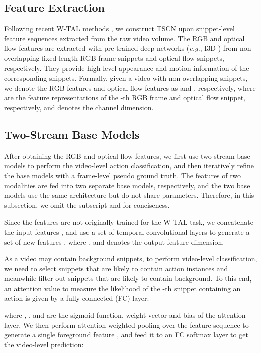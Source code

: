 \documentclass[runningheads]{llncs}
\begin{document}
\subsection{Feature Extraction}
Following recent W-TAL methods \cite{shou2018autoloc,nguyen2018weakly,paul2018w,liu2019completeness,liu2019weakly,nguyen2019weakly,narayan20193c,yu2019temporal,lee2020background}, we construct TSCN upon snippet-level feature sequences extracted from the raw video volume. The RGB and optical flow features are extracted with pre-trained deep networks (\textit{e.g.}, I3D \cite{carreira2017quo}) from non-overlapping fixed-length RGB frame snippets and optical flow snippets, respectively. They provide high-level appearance and motion information of the corresponding snippets.
Formally, given a video with  non-overlapping snippets, we denote the RGB features and optical flow features as  and , respectively, where  are the feature representations of the -th RGB frame and optical flow snippet, respectively, and  denotes the channel dimension. 


\subsection{Two-Stream Base Models}
After obtaining the RGB and optical flow features, we first use two-stream base models to perform the video-level action classification, and then iteratively refine the base models with a frame-level pseudo ground truth. The features of two modalities are fed into two separate base models, respectively, and the two base models use the same architecture but do not share parameters. Therefore, in this subsection, we omit the subscript  and  for conciseness.

Since the features are not originally trained for the W-TAL task, we concatenate the  input features , and use a set of temporal convolutional layers to generate a set of new features , where , and  denotes the output feature dimension.

As a video may contain background snippets, to perform video-level classification, we need to select snippets that are likely to contain action instances and meanwhile filter out snippets that are likely to contain background. To this end, an attention value  to measure the likelihood of the -th snippet containing an action is given by a fully-connected (FC) layer:

where , , and  are the sigmoid function, weight vector and bias of the attention layer. We then perform attention-weighted pooling over the feature sequence to generate a single foreground feature , and feed it to an FC softmax layer to get the video-level prediction:
\end{document}
